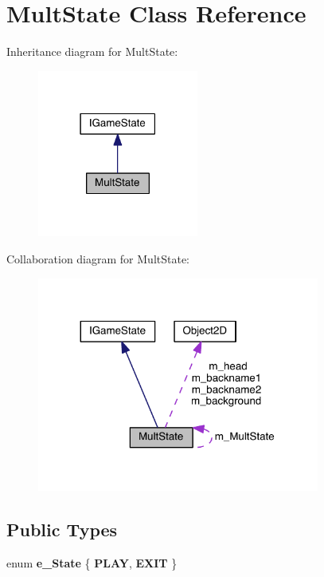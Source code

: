\hypertarget{class_mult_state}{}\section{Mult\+State Class Reference}
\label{class_mult_state}


Inheritance diagram for Mult\+State\+:\nopagebreak
\begin{figure}[H]
\begin{center}
\leavevmode
\includegraphics[width=150pt]{class_mult_state__inherit__graph}
\end{center}
\end{figure}


Collaboration diagram for Mult\+State\+:
\nopagebreak
\begin{figure}[H]
\begin{center}
\leavevmode
\includegraphics[width=263pt]{class_mult_state__coll__graph}
\end{center}
\end{figure}
\subsection*{Public Types}
\begin{DoxyCompactItemize}
\item 
\hypertarget{class_mult_state_ae8aea4bce555c6883b856b160ab5ce43}{}enum {\bfseries e\+\_\+\+State} \{ {\bfseries P\+L\+A\+Y}, 
{\bfseries E\+X\+I\+T}
 \}\label{class_mult_state_ae8aea4bce555c6883b856b160ab5ce43}

\end{DoxyCompactItemize}
